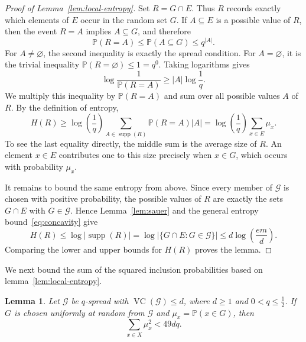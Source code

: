 \documentclass[10pt,a4paper]{amsart}
\newtheorem{lemma}[theorem]{Lemma}
\newcommand*{\abs}[1]{\lvert#1\rvert}
\newcommand{\cG}{\mathcal{G}}
\newcommand{\VC}{\operatorname{VC}}
\begin{document}
\begin{proof}[Proof of Lemma~\ref{lem:local-entropy}]
Set \(R=G\cap E\). Thus \(R\) records exactly which elements of \(E\) occur in the random set \(G\). If \(A\subseteq E\) is a possible value of \(R\), then the event \(R=A\) implies \(A\subseteq G\), and therefore
\[
\mathbb{P}(R=A)\le \mathbb{P}(A\subseteq G)\le q^{\abs{A}}.
\]
For \(A\ne\varnothing\), the second inequality is exactly the spread condition. For \(A=\varnothing\), it is the trivial inequality \(\mathbb{P}(R=\varnothing)\le 1=q^{0}\). Taking logarithms gives
\[
\log\frac{1}{\mathbb{P}(R=A)}\ge \abs{A}\log\frac{1}{q}.
\]
We multiply this inequality by \(\mathbb{P}(R=A)\) and sum over all possible values \(A\) of \(R\). By the definition of entropy,
\[
H(R)\ge \log\left(\frac{1}{q}\right)\sum_{A\in\operatorname{supp}(R)}\mathbb{P}(R=A)\abs{A}
=\log\left(\frac{1}{q}\right)\sum_{x\in E}\mu_{x}.
\]
To see the last equality directly, the middle sum is the average size of \(R\). An element \(x\in E\) contributes one to this size precisely when \(x\in G\), which occurs with probability \(\mu_{x}\).

It remains to bound the same entropy from above. Since every member of \(\cG\) is chosen with positive probability, the possible values of \(R\) are exactly the sets \(G\cap E\) with \(G\in\cG\). Hence Lemma~\ref{lem:sauer} and the general entropy bound~\eqref{eq:concavity} give
\[
H(R)\le\log\abs{\operatorname{supp}(R)}
=\log\abs{\{G\cap E:G\in\cG\}}
\le d\log\left(\frac{em}{d}\right).
\]
Comparing the lower and upper bounds for \(H(R)\) proves the lemma.
\end{proof}

We next bound the sum of the squared inclusion probabilities based on lemma~\ref{lem:local-entropy}.

\begin{lemma}\label{lem:square-sum}
Let \(\cG\) be \(q\)-spread with \(\VC(\cG)\le d\), where \(d\ge 1\) and \(0<q\le\frac{1}{2}\). If \(G\) is chosen uniformly at random from \(\cG\) and \(\mu_{x}=\mathbb{P}(x\in G)\), then
\[
\sum_{x\in X}\mu_{x}^{2}<49dq.
\]
\end{lemma}
\end{document}
